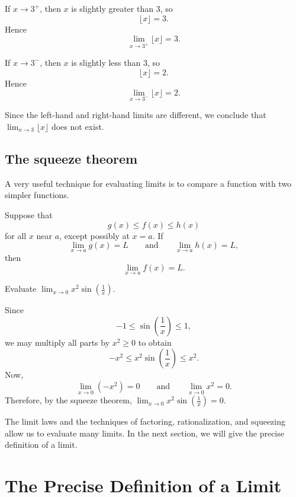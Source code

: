 \begin{solution}
If \(x\to 3^{+}\), then \(x\) is slightly greater than \(3\), so
\[
\lfloor x \rfloor=3.
\]
Hence
\[
\lim_{x\to 3^{+}}\lfloor x \rfloor=3.
\]

If \(x\to 3^{-}\), then \(x\) is slightly less than \(3\), so
\[
\lfloor x \rfloor=2.
\]
Hence
\[
\lim_{x\to 3^{-}}\lfloor x \rfloor=2.
\]

Since the left-hand and right-hand limits are different, we conclude that
\(\displaystyle
\lim_{x\to 3}\lfloor x \rfloor
\)
does not exist.
\end{solution}

\subsection{The squeeze theorem}

A very useful technique for evaluating limits is to compare a function with two simpler functions.

\begin{theorem}
Suppose that
\[
g(x)\le f(x)\le h(x)
\]
for all \(x\) near \(a\), except possibly at \(x=a\). If
\[
\lim_{x\to a}g(x)=L
\qquad \text{and} \qquad
\lim_{x\to a}h(x)=L,
\]
then
\[
\lim_{x\to a}f(x)=L.
\]
\end{theorem}

\begin{example}
Evaluate
\(\displaystyle
\lim_{x\to 0}x^{2}\sin\left(\frac{1}{x}\right).
\)
\end{example}

\begin{solution}
Since
\[
-1\le \sin\left(\frac{1}{x}\right)\le 1,
\]
we may multiply all parts by \(x^{2}\ge 0\) to obtain
\[
-x^{2}\le x^{2}\sin\left(\frac{1}{x}\right)\le x^{2}.
\]
Now,
\[
\lim_{x\to 0}(-x^{2})=0
\qquad \text{and} \qquad
\lim_{x\to 0}x^{2}=0.
\]
Therefore, by the squeeze theorem,
\(\displaystyle
\lim_{x\to 0}x^{2}\sin\left(\frac{1}{x}\right)=0.
\)
\end{solution}

The limit laws and the techniques of factoring, rationalization, and squeezing allow us to evaluate many limits. In the next section, we will give the precise definition of a limit.

\section{The Precise Definition of a Limit}

